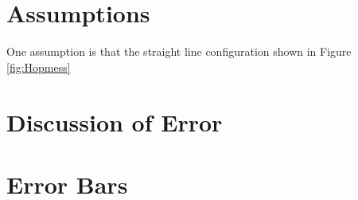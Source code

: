 
\section{Assumptions}

One assumption is that the straight line configuration shown in Figure \ref{fig:Hopmess}

\section{Discussion of Error}


\section{Error Bars}

